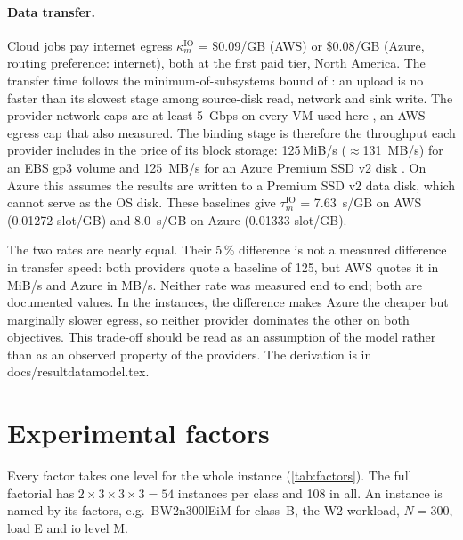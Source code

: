 \documentclass[11pt,a4paper]{article}
\newcommand{\tauIO}{\tau^{\mathrm{IO}}}
\newcommand{\kapIO}{\kappa^{\mathrm{IO}}}
\newcommand{\codeus}{\textunderscore\allowbreak}
\newcommand{\code}[1]{{\ttfamily\let\_\codeus #1}}
\begin{document}
\paragraph{Data transfer.} Cloud jobs pay internet egress
$\kapIO_m$ = \$0.09/GB (AWS) or \$0.08/GB (Azure, routing preference: internet),
both at the first paid tier, North America. The transfer time follows the
minimum-of-subsystems bound of \citet{liu2017explaining}: an upload is no faster
than its slowest stage among source-disk read, network and sink write. The
provider network caps are at least \SI{5}{Gbps} on every VM used here
\citep{aws-bandwidth,azure-bandwidth}, an AWS egress cap that
\citet{jain2023skyplane} also measured. The binding stage is therefore the
throughput each provider includes in the price of its block storage: 125\,MiB/s
($\approx$\SI{131}{MB/s}) for an EBS gp3 volume \citep{aws-ebs} and \SI{125}{MB/s}
for an Azure Premium SSD v2 disk \citep{azure-disks}. On Azure this assumes the
results are written to a Premium SSD v2 data disk, which cannot serve as the OS
disk. These baselines give $\tauIO_m$ = \SI{7.63}{s/GB} on AWS (0.01272 slot/GB)
and \SI{8.0}{s/GB} on Azure (0.01333 slot/GB).

The two rates are nearly equal. Their 5\,\% difference is not a measured
difference in transfer speed: both providers quote a baseline of 125, but AWS
quotes it in MiB/s and Azure in MB/s. Neither rate was measured end to end; both
are documented values. In the instances, the difference makes Azure the cheaper
but marginally slower egress, so neither provider dominates the other on both
objectives. This trade-off should be read as an assumption of the model rather
than as an observed property of the providers. The derivation is in
\code{docs/result\_data\_model.tex}.

\section{Experimental factors}\label{sec:factors}
Every factor takes one level for the whole instance (\cref{tab:factors}). The
full factorial has $2\times3\times3\times3=54$ instances per class and 108 in all.
An instance is named by its factors, e.g.\ \code{B\_W2\_n300\_lE\_iM} for class~B,
the W2 workload, $N=300$, load E and io level M.
\end{document}
